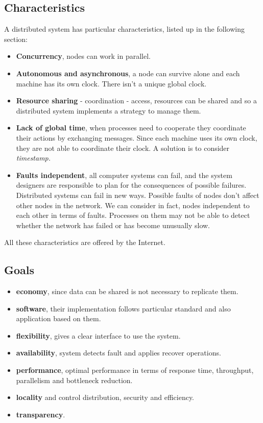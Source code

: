 \subsection{Characteristics}
A distributed system has particular characteristics, listed up in the following section:
\begin{itemize}
    \item \textbf{Concurrency}, nodes can work in parallel.
    \item \textbf{Autonomous and asynchronous}, a node can survive alone and each machine has its own clock. There isn't a unique global clock.
    \item \textbf{Resource sharing} - coordination - access, resources can be shared and so a distributed system implements a strategy to manage them. 
    \item \textbf{Lack of global time}, when processes need to cooperate they coordinate their actions by exchanging messages. Since each machine uses its own clock, they are not able to coordinate their clock. A solution is to consider \textit{timestamp.}
    \item \textbf{Faults independent}, all computer systems can fail, and the system designers are responsible to plan for the consequences of possible failures. Distributed systems can fail in new ways. Possible faults of nodes don't affect other nodes in the network. We can consider in fact, nodes independent to each other in terms of faults. Processes
    on them may not be able to detect whether the network has failed or has become
    unusually slow.
\end{itemize}
All these characteristics are offered by the Internet.

\subsection{Goals}
\begin{itemize}
    \item \textbf{economy}, since data can be shared is not necessary to replicate them.
    \item \textbf{software}, their implementation follows particular standard and also application based on them.
    \item \textbf{flexibility}, gives a clear interface to use the system.
    \item \textbf{availability}, system detects fault and applies recover operations.
    \item \textbf{performance}, optimal performance in terms of response time, throughput, parallelism and bottleneck reduction.
    \item \textbf{locality} and control distribution, security and efficiency.
    \item \textbf{transparency}.
\end{itemize}

